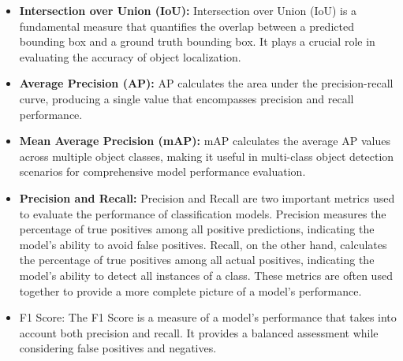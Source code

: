 \begin{itemize}
    \item \textbf{Intersection over Union (IoU):} Intersection over Union (IoU) is a fundamental measure that quantifies the overlap between a predicted bounding box and a ground truth bounding box. It plays a crucial role in evaluating the accuracy of object localization.
    \item \textbf{Average Precision (AP):} AP calculates the area under the precision-recall curve, producing a single value that encompasses precision and recall performance.
    \item \textbf{Mean Average Precision (mAP):} mAP calculates the average AP values across multiple object classes, making it useful in multi-class object detection scenarios for comprehensive model performance evaluation.
    \item \textbf{Precision and Recall:} Precision and Recall are two important metrics used to evaluate the performance of classification models. Precision measures the percentage of true positives among all positive predictions, indicating the model's ability to avoid false positives. Recall, on the other hand, calculates the percentage of true positives among all actual positives, indicating the model's ability to detect all instances of a class. These metrics are often used together to provide a more complete picture of a model's performance.
    \item F1 Score: The F1 Score is a measure of a model's performance that takes into account both precision and recall. It provides a balanced assessment while considering false positives and negatives.
\end{itemize}

